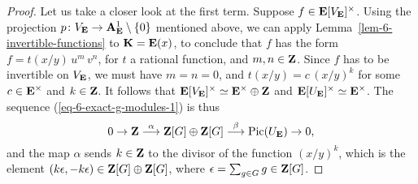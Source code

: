 \begin{proof}
    Let us take a closer look at the first term.
    Suppose $f \in \bbE[V_{\bbE}]^\times$.
    Using the projection $p \: V_{\bbE} \to \bbA_{\bbE}^1 \setminus \{0\}$ mentioned above,
    we can apply Lemma~\ref{lem-6-invertible-functions} to $\bbK = \bbE(x)$,
    to conclude that $f$ has the form $f = t(x/y) \, u^m \, v^n$, for $t$ a rational function, and
    $m,n \in \bbZ$.
    Since $f$ has to be invertible on $V_{\bbE}$,
    we must have $m = n = 0$, and $t(x/y) = c \, (x/y)^k$ for some $c \in \bbE^\times$ and $k \in \bbZ$.
    It follows that $\bbE[V_{\bbE}]^\times \simeq \bbE^\times \oplus \bbZ$ and $\bbE[U_{\bbE}]^\times \simeq \bbE^\times$.
    The sequence (\ref{eq-6-exact-g-modules-1}) is thus 
    \[
        0   \to \bbZ
            \overset{\alpha}{\longrightarrow} \bbZ[G] \oplus \bbZ[G]
            \overset{\beta}{\longrightarrow}  \operatorname{Pic} (U_{\bbE}) \to 0,
    \]
    and the map $\alpha$ sends $k \in \bbZ$ to the divisor of the function $(x/y)^k$,
    which is the element $(k\epsilon, -k\epsilon) \in \bbZ[G] \oplus \bbZ[G]$,
    where $\epsilon = \sum_{g \in G} g \in \bbZ[G]$.

    



\end{proof}
